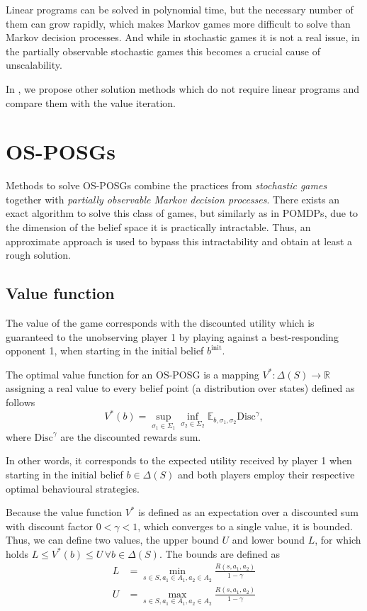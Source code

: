 \documentclass[../main.tex]{subfiles}
\begin{document}
Linear programs can be solved in polynomial time, but the necessary number of them can grow rapidly, which makes Markov games more difficult to solve than Markov decision processes. 
And while in stochastic games it is not a real issue, in the partially observable stochastic games this becomes a crucial cause of unscalability.

In , we propose other solution methods which do not require linear programs and compare them with the value iteration.

\section{OS-POSGs}\label{standard:osposg}
Methods to solve OS-POSGs combine the practices from \textit{stochastic games} together with \textit{partially observable Markov decision processes}.
There exists an exact algorithm to solve this class of games, but similarly as in POMDPs, due to the dimension of the belief space it is practically intractable.
Thus, an approximate approach is used to bypass this intractability and obtain at least a rough solution.

\subsection{Value function}\label{standard:osposg:valfunc}
The value of the game corresponds with the discounted utility which is guaranteed to the unobserving player 1 by playing against a best-responding opponent 1, when starting in the initial belief $b^{\text{init}}$.
\begin{definition}
    The optimal value function for an OS-POSG is a mapping $V^* : \Delta(S) \to \mathbb{R}$ assigning a real value to every belief point (a distribution over states) defined as follows \cite{poposgsthesis}
    $$
        V^*(b) = \sup_{\sigma_1 \in \Sigma_1} \inf_{\sigma_2 \in \Sigma_2} \mathbb{E}_{b, \sigma_1, \sigma_2} \text{Disc}^{\gamma},
    $$
    where $\text{Disc}^{\gamma}$ are the discounted rewards sum.
\end{definition}
In other words, it corresponds to the expected utility received by player 1 when starting in the initial belief $b \in \Delta(S)$ and both players employ their respective optimal behavioural strategies.

Because the value function $V^*$ is defined as an expectation over a discounted sum with discount factor $0 < \gamma < 1$, which converges to a single value, it is bounded.
Thus, we can define two values, the upper bound $U$ and lower bound $L$, for which holds $L \leq V^*(b) \leq U \, \forall b \in \Delta(S)$.
The bounds are defined as
\begin{align}
    L &= \min_{s \in S, a_1 \in A_1, a_2 \in A_2} \frac{R(s, a_1, a_2)}{1 - \gamma} \\
    U &= \max_{s \in S, a_1 \in A_1, a_2 \in A_2} \frac{R(s, a_1, a_2)}{1 - \gamma}
\end{align}
\end{document}
